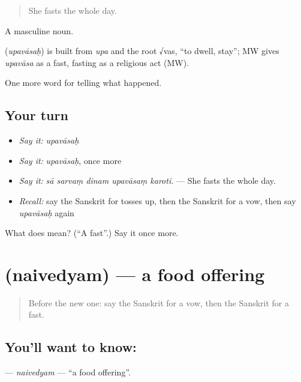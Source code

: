 \begin{quote}
She fasts the whole day.
\end{quote}

A masculine noun.

\begin{cousinweb}
\textbf{} (\emph{upavāsaḥ}) is built from \emph{upa} and the root √vas, \textquotedblleft{}to dwell, stay\textquotedblright{}; MW gives \emph{upavāsa} as a fast, fasting as a religious act (MW).
\end{cousinweb}

\begin{grammarlens}[title={What you've built}]
One more word for telling what happened.
\end{grammarlens}

\subsection*{Your turn}
\begin{itemize}
\raggedright
  \item \emph{Say it:} \emph{upavāsaḥ}
  \item \emph{Say it:} \emph{upavāsaḥ}, once more
  \item \emph{Say it:} \emph{sā sarvaṃ dinam upavāsaṃ karoti.} — She fasts the whole day.
  \item \emph{Recall:} say the Sanskrit for tosses up, then the Sanskrit for a vow, then say \emph{upavāsaḥ} again
\end{itemize}

\begin{tcolorbox}[breakable,colback=teal!4,colframe=teal!35!black,title={Before you move on}]
What does  mean? (\textquotedblleft{}A fast\textquotedblright{}.) Say it once more.
\end{tcolorbox}
\section[\texorpdfstring{\sk{नैवेद्यम्} (naivedyam)}{नैवेद्यम् (naivedyam)}]{ (naivedyam) — a food offering}

\label{lesson:SA-C328-naivedyam}



\begin{quote}
Before the new one: say the Sanskrit for a vow, then the Sanskrit for a fast.
\end{quote}

\subsection*{You'll want to know: }
\textbf{} — \emph{naivedyam} — \textquotedblleft{}a food offering\textquotedblright{}.

